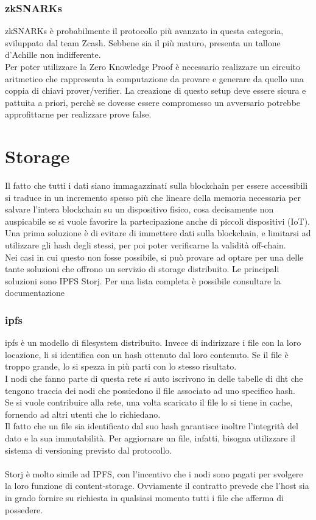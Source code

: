 \documentclass[12pt, letterpaper, twoside]{article}
\begin{document}
\subsubsection{zkSNARKs}
zkSNARKs è probabilmente il protocollo più avanzato in questa categoria, sviluppato dal team Zcash. Sebbene sia il più maturo, presenta un tallone d'Achille non indifferente. \\
Per poter utilizzare la Zero Knowledge Proof è necessario realizzare un circuito aritmetico che rappresenta la computazione da provare e generare da quello una coppia di chiavi prover/verifier.
La creazione di questo setup deve essere sicura e pattuita a priori, perchè se dovesse essere compromesso un avversario potrebbe approfittarne per realizzare prove false.
 
\newpage
 
\section{Storage}
Il fatto che tutti i dati siano immagazzinati sulla blockchain per essere accessibili si traduce in un incremento spesso più che lineare della memoria necessaria per salvare l'intera blockchain su un dispositivo fisico, cosa decisamente non auspicabile se si vuole favorire la partecipazione anche di piccoli dispositivi (IoT). \\
Una prima soluzione è di evitare di immettere dati sulla blockchain, e limitarsi ad utilizzare gli hash degli stessi, per poi poter verificarne la validità off-chain. \\
Nei casi in cui questo non fosse possibile, si può provare ad optare per una delle tante soluzioni che offrono un servizio di storage distribuito.
Le principali soluzioni sono IPFS Storj.
Per una lista completa è possibile consultare la documentazione \cite{wiki:ew-storage}
 
\subsubsection{\gls{ipfs}}
\gls{ipfs} è un modello di filesystem distribuito.
Invece di indirizzare i file con la loro locazione, li si identifica con un hash ottenuto dal loro contenuto.
Se il file è troppo grande, lo si spezza in più parti con lo stesso risultato. \\
I nodi che fanno parte di questa rete si auto iscrivono in delle tabelle di \gls{dht} che tengono traccia dei nodi che possiedono il file associato ad uno specifico hash. \\
Se si vuole contribuire alla rete, una volta scaricato il file lo si tiene in cache, fornendo ad altri utenti che lo richiedano. \\
Il fatto che un file sia identificato dal suo hash garantisce inoltre l'integrità del dato e la sua immutabilità.
Per aggiornare un file, infatti, bisogna utilizzare il sistema di versioning previsto dal protocollo. \\ \\
Storj è molto simile ad IPFS, con l'incentivo che i nodi sono pagati per svolgere la loro funzione di content-storage.
Ovviamente il contratto prevede che l'host sia in grado fornire su richiesta in qualsiasi momento tutti i file che afferma di possedere.
 
\end{document}
